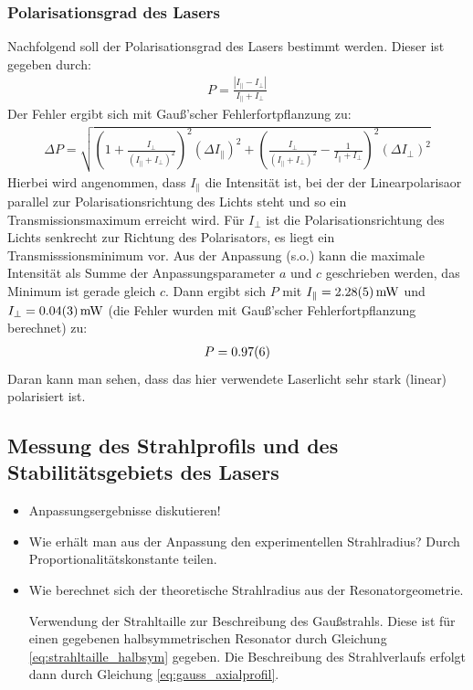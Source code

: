 \documentclass[11pt, a4paper]{article}
\numberwithin{equation}{section}
\begin{document}
\subsubsection{Polarisationsgrad des Lasers}
Nachfolgend soll der Polarisationsgrad des Lasers bestimmt werden.
Dieser ist gegeben durch:
\begin{align}
P=\frac{|I_{\parallel}-I_{\perp}|}{I_{\parallel}+I_{\perp}}
\end{align}
Der Fehler ergibt sich mit Gauß'scher Fehlerfortpflanzung zu:
\begin{align}
\Delta P=\sqrt{\left(1+\frac{I_{\perp}}{(I_{\parallel}+I_{\perp})^2}\right)^2\left(\Delta I_{\parallel}\right)^2 + \left(\frac{I_{\perp}}{(I_{\parallel}+I_{\perp})^2}-\frac{1}{I_{\parallel}+I_{\perp}}\right)^2\left(\Delta I_{\perp}\right)^2}
\end{align}
Hierbei wird angenommen, dass $I_\parallel$ die Intensität ist, bei der der Linearpolarisaor parallel zur Polarisationsrichtung des Lichts steht und so ein Transmissionsmaximum erreicht wird.
Für $I_\perp$ ist die Polarisationsrichtung des Lichts senkrecht zur Richtung des Polarisators, es liegt ein Transmisssionsminimum vor.
Aus der Anpassung (s.o.) kann die maximale Intensität als Summe der Anpassungsparameter $a$ und $c$ geschrieben werden, das Minimum ist gerade gleich $c$. 
Dann ergibt sich $P$ mit $I_\parallel=\SI{2.28+-0.05}{\milli\watt}$ und $I_\perp=\SI{0.04+-0.03}{\milli\watt}$ (die Fehler wurden mit Gauß'scher Fehlerfortpflanzung berechnet) zu:
\begin{align}
P=\num{0.97+-0.06}
\end{align}
Daran kann man sehen, dass das hier verwendete Laserlicht sehr stark (linear) polarisiert ist.

\subsection{Messung des Strahlprofils und des Stabilitätsgebiets des Lasers}

\begin{itemize}		
	\item Anpassungsergebnisse diskutieren!
	
	\item Wie erhält man aus der Anpassung den experimentellen Strahlradius? Durch Proportionalitätskonstante teilen.
	
	\item Wie berechnet sich der theoretische Strahlradius aus der Resonatorgeometrie.
	
	Verwendung der Strahltaille zur Beschreibung des Gaußstrahls.
	Diese ist für einen gegebenen halbsymmetrischen Resonator durch Gleichung \ref{eq:strahltaille_halbsym} gegeben.
	Die Beschreibung des Strahlverlaufs erfolgt dann durch Gleichung \ref{eq:gauss_axialprofil}.
	
\end{itemize}
\end{document}

